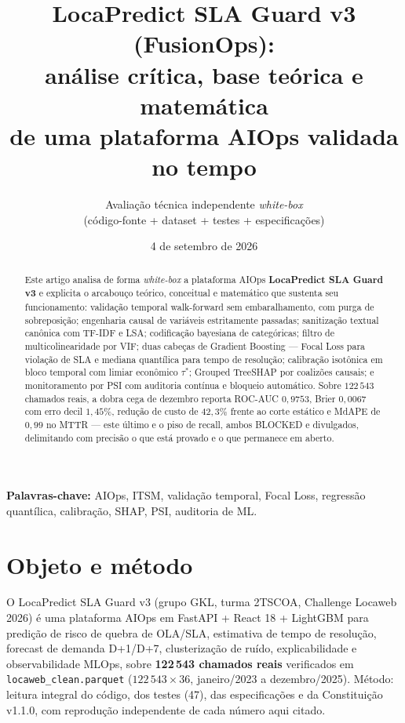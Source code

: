 \documentclass[11pt,a4paper]{article}
\title{LocaPredict SLA Guard v3 (FusionOps):\\ análise crítica, base teórica e matemática\\ de uma plataforma AIOps validada no tempo}
\author{Avaliação técnica independente \emph{white-box} \\ (código-fonte + dataset + testes + especificações)}
\date{4 de setembro de 2026}
\begin{document}
\maketitle

\begin{abstract}
Este artigo analisa de forma \emph{white-box} a plataforma AIOps
\textbf{LocaPredict SLA Guard v3} e explicita o arcabouço teórico, conceitual
e matemático que sustenta seu funcionamento: validação temporal walk-forward
sem embaralhamento, com purga de sobreposição; engenharia causal de variáveis
estritamente passadas; sanitização textual canônica com TF-IDF e LSA;
codificação bayesiana de categóricas; filtro de multicolinearidade por VIF;
duas cabeças de Gradient Boosting --- Focal Loss para violação de SLA e
mediana quantílica para tempo de resolução; calibração isotônica em bloco
temporal com limiar econômico $\tau^*$; Grouped TreeSHAP por coalizões
causais; e monitoramento por PSI com auditoria contínua e bloqueio automático.
Sobre $122\,543$ chamados reais, a dobra cega de dezembro reporta ROC-AUC
$0{,}9753$, Brier $0{,}0067$ com erro decil $1{,}45\%$, redução de custo de
$42{,}3\%$ frente ao corte estático e MdAPE de $0{,}99$ no MTTR --- este último
e o piso de recall, ambos BLOCKED e divulgados, delimitando com precisão o que
está provado e o que permanece em aberto.
\end{abstract}

\noindent\textbf{Palavras-chave:} AIOps, ITSM, validação temporal, Focal Loss,
regressão quantílica, calibração, SHAP, PSI, auditoria de ML.

\tableofcontents
\newpage

\section{Objeto e método}

O LocaPredict SLA Guard v3 (grupo GKL, turma 2TSCOA, Challenge Locaweb 2026) é
uma plataforma AIOps em FastAPI + React 18 + LightGBM para predição de risco
de quebra de OLA/SLA, estimativa de tempo de resolução, forecast de demanda
D+1/D+7, clusterização de ruído, explicabilidade e observabilidade MLOps,
sobre \textbf{122\,543 chamados reais} verificados em
\texttt{locaweb\_clean.parquet} ($122\,543 \times 36$, janeiro/2023 a
dezembro/2025). Método: leitura integral do código, dos testes (47),
das especificações e da Constituição v1.1.0, com reprodução independente de
cada número aqui citado.
\end{document}
